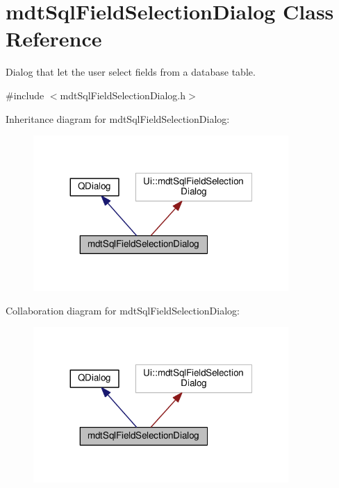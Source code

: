 \hypertarget{classmdt_sql_field_selection_dialog}{\section{mdt\-Sql\-Field\-Selection\-Dialog Class Reference}
\label{classmdt_sql_field_selection_dialog}
}


Dialog that let the user select fields from a database table.  




{\ttfamily \#include $<$mdt\-Sql\-Field\-Selection\-Dialog.\-h$>$}



Inheritance diagram for mdt\-Sql\-Field\-Selection\-Dialog\-:
\nopagebreak
\begin{figure}[H]
\begin{center}
\leavevmode
\includegraphics[width=275pt]{classmdt_sql_field_selection_dialog__inherit__graph}
\end{center}
\end{figure}


Collaboration diagram for mdt\-Sql\-Field\-Selection\-Dialog\-:
\nopagebreak
\begin{figure}[H]
\begin{center}
\leavevmode
\includegraphics[width=275pt]{classmdt_sql_field_selection_dialog__coll__graph}
\end{center}
\end{figure}
